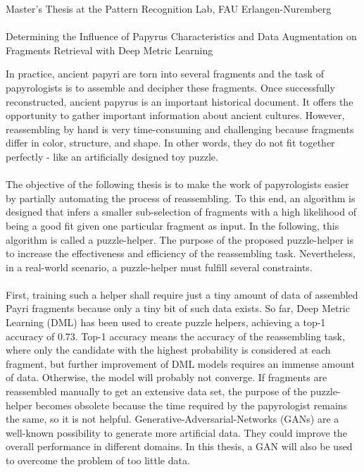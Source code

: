 \documentclass[12pt,a4paper]{article}
\begin{document}
\begin{center}
	Master's Thesis at the Pattern Recognition Lab, FAU Erlangen-Nuremberg \hfill \\[5mm]
																				
	\mbox{}\\
	{\Large Determining the Influence of Papyrus Characteristics and Data Augmentation on Fragments Retrieval with Deep Metric Learning}
			
\end{center}


In practice, ancient papyri are torn into several fragments and the task of papyrologists is to assemble and decipher these fragments. Once successfully reconstructed, ancient papyrus is an important historical document. It offers the opportunity to gather important information about ancient cultures.
However, reassembling by hand is very time-consuming and challenging because fragments differ in color, structure, and shape. In other words, they do not fit together perfectly - like an artificially designed toy puzzle. 
\\\\
The objective of the following thesis is to make the work of papyrologists easier by partially automating the process of reassembling. To this end, an algorithm is designed that infers a smaller sub-selection of fragments with a high likelihood of being a good fit given one particular fragment as input. 
In the following, this algorithm is called a puzzle-helper. The purpose of the proposed puzzle-helper is to increase the effectiveness and efficiency of the reassembling task.  Nevertheless, in a real-world scenario, a puzzle-helper must fulfill several constraints.
\\\\
First, training such a helper shall require just a tiny amount of data of assembled Payri fragments because only a tiny bit of such data exists. So far, Deep Metric Learning (DML) has been used to create puzzle helpers, achieving a top-1 accuracy of 0.73. Top-1 accuracy means the accuracy of the reassembling task, where only the candidate with the highest probability is considered at each fragment, but further improvement of DML models requires an immense amount of data. Otherwise, the model will probably not converge. If fragments are reassembled manually to get an extensive data set, the purpose of the puzzle-helper becomes obsolete because the time required by the papyrologist remains the same, so it is not helpful. Generative-Adversarial-Networks (GANs) are a well-known possibility to generate more artificial data. They could improve the overall performance in different domains. In this thesis, a GAN will also be used to overcome the problem of too little data. 
\end{document}
